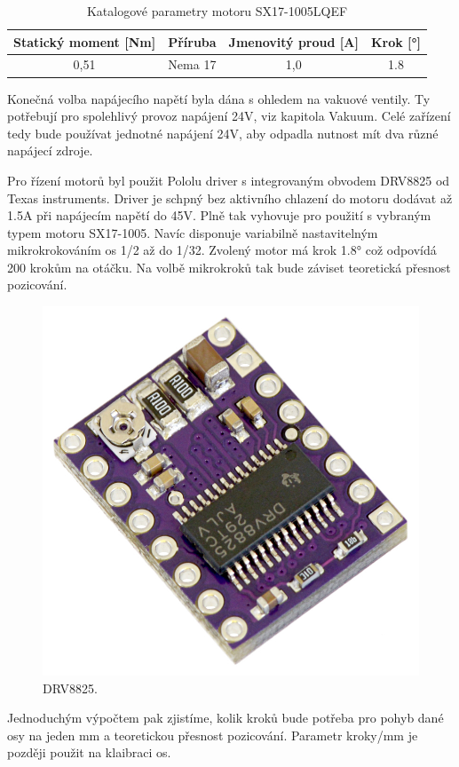 \begin{table}[h!]
  \caption{Katalogové parametry motoru SX17-1005LQEF }
  \begin{center}
  	\small
	  \begin{tabular}{|c|c|c|c|}
	    \hline
	    Statický moment [Nm]		& Příruba 		& Jmenovitý proud [A]	& Krok [°]	\\
	    \hline\hline

		0,51				& Nema 17		& 1,0			& 1.8		\\

	    \hline
	  \end{tabular}
  \end{center}
\end{table}

Konečná volba napájecího napětí byla dána s ohledem na vakuové ventily. Ty potřebují pro spolehlivý provoz napájení 24V, viz kapitola Vakuum. Celé zařízení tedy bude používat jednotné napájení 24V, aby odpadla nutnost mít dva různé napájecí zdroje.


Pro řízení motorů byl použit Pololu driver s integrovaným obvodem DRV8825 od Texas instruments. Driver je schpný bez aktivního chlazení do motoru dodávat až 1.5A při napájecím napětí do 45V. Plně tak vyhovuje pro použití s vybraným typem motoru SX17-1005. Navíc disponuje variabilně nastavitelným mikrokrokováním os 1/2 až do 1/32. 
Zvolený motor má krok 1.8° což odpovídá 200 krokům na otáčku. Na volbě mikrokroků tak bude záviset teoretická přesnost pozicování.

\begin{figure}[h!]

  \centering
    \includegraphics[width=0.4\linewidth]{obrazky/DRV8825.jpg}%
    \caption{DRV8825.}
\end{figure}

Jednoduchým výpočtem pak zjistíme, kolik kroků bude potřeba pro pohyb dané osy na jeden mm a teoretickou přesnost pozicování. Parametr kroky/mm je později použit na klaibraci os.
 

